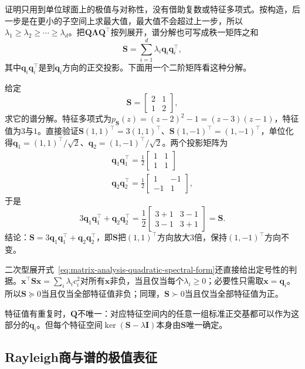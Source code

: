 证明只用到单位球面上的极值与对称性，没有借助复数或特征多项式。按构造，后一步是在更小的子空间上求最大值，最大值不会超过上一步，所以$\lambda_1\geq\lambda_2\geq\cdots\geq\lambda_d$。把$\bm Q\bm\Lambda\bm Q^\top$按列展开，谱分解也可写成秩一矩阵之和
\[
 \bm S=\sum_{i=1}^d\lambda_i\bm q_i\bm q_i^\top ,
\]
其中$\bm q_i\bm q_i^\top$是到$\bm q_i$方向的正交投影。下面用一个二阶矩阵看这种分解。
\begin{example}[二阶对称矩阵的谱分解]
\label{ex:ls-symmetric-spectral-two-by-two}
给定
\[
 \bm S=\begin{bmatrix}2&1\\1&2\end{bmatrix},
\]
求它的谱分解。特征多项式为$p_{\bm S}(z)=(z-2)^2-1=(z-3)(z-1)$，特征值为$3$与$1$。直接验证$\bm S(1,1)^\top=3(1,1)^\top$、$\bm S(1,-1)^\top=(1,-1)^\top$，单位化得$\bm q_1=(1,1)^\top/\sqrt2$、$\bm q_2=(1,-1)^\top/\sqrt2$。两个投影矩阵为
\[
\begin{gathered}
\bm q_1\bm q_1^\top=\frac12\begin{bmatrix}1&1\\1&1\end{bmatrix}\\
\bm q_2\bm q_2^\top=\frac12\begin{bmatrix}1&-1\\-1&1\end{bmatrix},
\end{gathered}
\]
于是
\[
 3\bm q_1\bm q_1^\top+\bm q_2\bm q_2^\top
 =\frac12\begin{bmatrix}3+1&3-1\\3-1&3+1\end{bmatrix}=\bm S .
\]
结论：$\bm S=3\bm q_1\bm q_1^\top+\bm q_2\bm q_2^\top$，即$\bm S$把$(1,1)^\top$方向放大$3$倍，保持$(1,-1)^\top$方向不变。
\end{example}

二次型展开式~\eqref{eq:matrix-analysis-quadratic-spectral-form}还直接给出定号性的判据。$\bm x^\top\bm S\bm x=\sum_i\lambda_ic_i^2$对所有$\bm x$非负，当且仅当每个$\lambda_i\geq0$；必要性只需取$\bm x=\bm q_i$。所以$\bm S\succeq0$当且仅当全部特征值非负；同理，$\bm S\succ0$当且仅当全部特征值为正。

特征值有重复时，$\bm Q$不唯一：对应特征空间内的任意一组标准正交基都可以作为这部分的$\bm q_i$。但每个特征空间$\ker(\bm S-\lambda\bm I)$本身由$\bm S$唯一确定。

\subsection{Rayleigh商与谱的极值表征}
\label{sec:ls-rayleigh-extremal}
\label{sec:ls-sphere-existence}
\label{sec:linear-algebra-constrained-estimation}
\label{sec:ls-sphere-solve}

